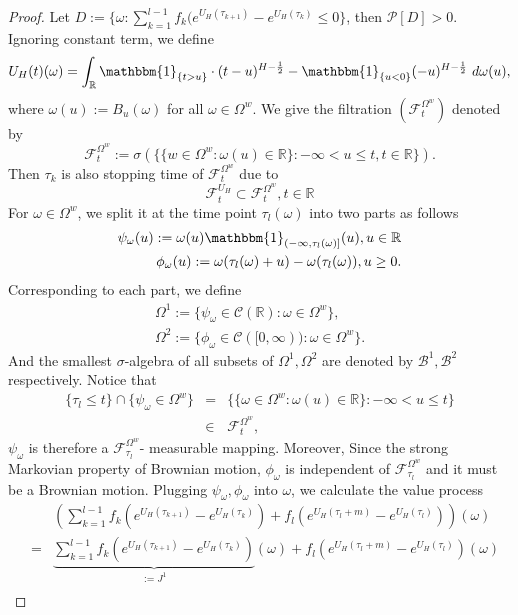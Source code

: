 \documentclass[a4paper, twoside, 11pt]{article}
\theoremstyle{definition}
\newcommand{\brkt}[1]{\left({#1} \right)}
\begin{document}
\begin{proof}
	Let $D:= \{\omega: \sum_{k=1}^{l-1} f_k (e^{U_H(\tau_{k+1})} - e^{U_H(\tau_k)} \le 0\}$, then $\mathcal{P}[D] > 0$.
	Ignoring constant term, we define 
	$$
	U_H(t)(\omega) = \int_{\mathbb{R}} \mathbbm{1}_{\{t> u\}}\cdot (t-u)^{H-\frac{1}{2}} - \mathbbm{1}_{\{u< 0\}} (-u)^{H-\frac{1}{2}} \, \mathop{d\omega(u)},
	$$
	where $\omega(u) := B_u(\omega)$ for all $\omega \in \Omega^w$.
	We give the filtration $(\mathcal{F}_t^{\Omega^w})$ denoted by 
	$$
	\mathcal{F}_t^{\Omega^w} := \sigma(\{\{w \in \Omega^w : \omega(u) \in \mathbb{R}\} : -\infty < u \le t, t\in\mathbb{R}\}).
	$$
	Then $\tau_k$ is also stopping time of $\mathcal{F}_t^{\Omega^w}$ due to
	$$
	\mathcal{F}^{U_H}_t \subset \mathcal{F}_t^{\Omega^w},	t \in \mathbb{R}
	$$
   For $\omega \in \Omega^w$, we split it at the time point $\tau_l(\omega)$ into two parts as follows
   \begin{eqnarray*}
   \psi_{\omega}(u) := \omega(u)\mathbbm{1}_{(-\infty, \tau_l(\omega)]}(u), u\in \mathbb{R} \\
	 \phi_{\omega}(u) := \omega(\tau_l(\omega) + u) - \omega(\tau_l(\omega)), u\ge 0.
   \end{eqnarray*}
  Corresponding to each part, we define
  \begin{eqnarray*}
	\Omega^1 := \{\psi_{\omega} \in \mathcal{C}(\mathbb{R}) : \omega \in \Omega^w\},\\
	\Omega^2 := \{\phi_{\omega} \in \mathcal{C}([0, \infty)) : \omega \in \Omega^w\}.
  \end{eqnarray*}
  And the smallest $\sigma$-algebra of all subsets of $\Omega^1, \Omega^2$ are denoted by $\mathscr{B}^1, \mathscr{B}^2$ respectively.
  Notice that
  \begin{eqnarray*}
	\{\tau_l \le t\} \cap \{\psi_{\omega} \in \Omega^w\} &=& \{\{\omega \in \Omega^w : \omega(u) \in \mathbb{R}\} : -\infty < u \le t\}\\
	&\in& \mathcal{F}^{\Omega^w}_t,
  \end{eqnarray*}
  $\psi_{\omega}$ is therefore a $\mathcal{F}^{\Omega^w}_{\tau_l}$- measurable mapping. Moreover, Since the strong Markovian property of Brownian motion, $\phi_{\omega}$ is independent of $\mathcal{F}^{\Omega^w}_{\tau_l}$ and it must be a Brownian motion.  Plugging  $\psi_{\omega}, \phi_{\omega}$ into $\omega$, we calculate the value process
  \begin{eqnarray*}
	&&\brkt{\sum_{k=1}^{l-1} f_k (e^{U_H(\tau_{k+1})}  - e^{U_H(\tau_{k})}) + f_l(e^{U_H(\tau_l+m)}-e^{U_H(\tau_l)})} (\omega)  \\
	&=& \underbrace{\sum_{k=1}^{l-1} f_k (e^{U_H(\tau_{k+1})} - e^{U_H(\tau_{k})})}_{:=J^1} (\omega) + f_l(e^{U_H(\tau_l+m)}-e^{U_H(\tau_l)}) (\omega) \\

\end{eqnarray*}
\end{proof}
\end{document}
